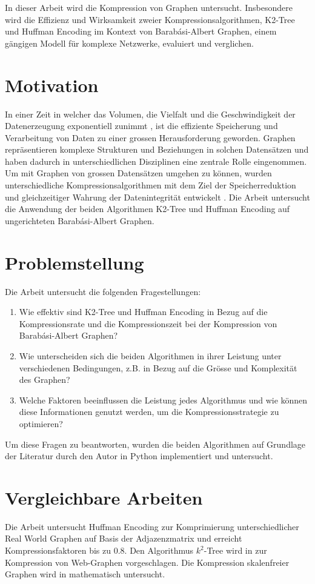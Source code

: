 \documentclass{ffhsthesis}
\begin{document}
In dieser Arbeit wird die Kompression von Graphen untersucht. Insbesondere wird die Effizienz und Wirksamkeit zweier Kompressionsalgorithmen, K2-Tree und Huffman Encoding im Kontext von Barabási-Albert Graphen, einem gängigen Modell für komplexe Netzwerke, evaluiert und verglichen.

\section{Motivation}
In einer Zeit in welcher das Volumen, die Vielfalt und die Geschwindigkeit der Datenerzeugung exponentiell zunimmt \cite{naeem2022trends}, ist die effiziente Speicherung und Verarbeitung von Daten zu einer grossen Herausforderung geworden. Graphen repräsentieren komplexe Strukturen und Beziehungen in solchen Datensätzen und haben dadurch in unterschiedlichen Disziplinen eine zentrale Rolle eingenommen. Um mit Graphen von grossen Datensätzen umgehen zu können, wurden unterschiedliche Kompressionsalgorithmen mit dem Ziel der Speicherreduktion und gleichzeitiger Wahrung der Datenintegrität entwickelt \cite{besta2018survey}. Die Arbeit untersucht die Anwendung der beiden Algorithmen K2-Tree und Huffman Encoding auf ungerichteten Barabási-Albert Graphen. 

\section{Problemstellung}
\label{ch:problemstellung}
Die Arbeit untersucht die folgenden Fragestellungen:
\begin{enumerate}
    \item Wie effektiv sind K2-Tree und Huffman Encoding in Bezug auf die Kompressionsrate und die Kompressionszeit bei der Kompression von Barabási-Albert Graphen?
    \item Wie unterscheiden sich die beiden Algorithmen in ihrer Leistung unter verschiedenen Bedingungen, z.B. in Bezug auf die Grösse und Komplexität des Graphen?
    \item Welche Faktoren beeinflussen die Leistung jedes Algorithmus und wie können diese Informationen genutzt werden, um die Kompressionsstrategie zu optimieren? 
\end{enumerate}

Um diese Fragen zu beantworten, wurden die beiden Algorithmen auf Grundlage der Literatur durch den Autor in Python implementiert und untersucht.

\section{Vergleichbare Arbeiten}
Die Arbeit \cite{zhu2022research} untersucht Huffman Encoding zur Komprimierung unterschiedlicher Real World Graphen auf Basis der Adjazenzmatrix und erreicht Kompressionsfaktoren bis zu $0.8$. Den Algorithmus $k^2$-Tree wird in \cite{brisaboa2009k2} zur Kompression von Web-Graphen vorgeschlagen. Die Kompression skalenfreier Graphen wird in \cite{luczak2017structural} mathematisch untersucht. 
\end{document}
